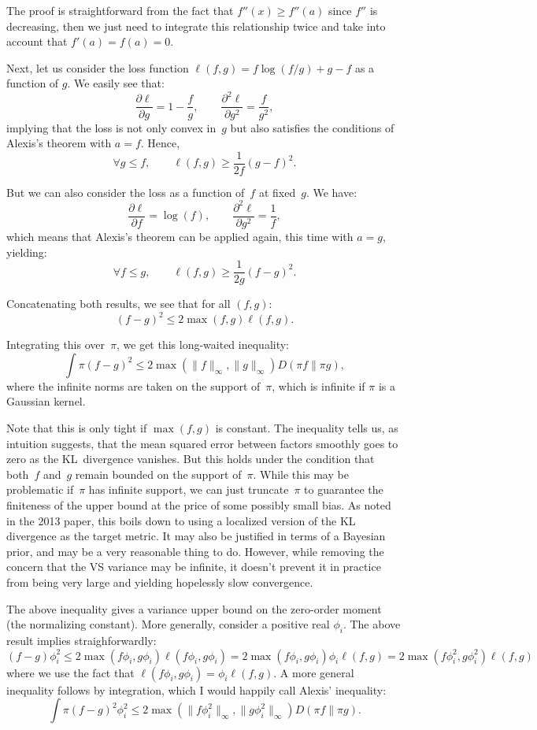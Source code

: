 \documentclass{article}
\begin{document}
The proof is straightforward from the fact that $f''(x) \geq f''(a)$ since $f''$ is decreasing, then we just need to integrate this relationship twice and take into account that $f'(a)=f(a)=0$.

Next, let us consider the loss function $\ell(f,g)=f\log(f/g)+g-f$ as a function of $g$. We easily see that:
$$
\frac{\partial\ell}{\partial g} = 1 - \frac{f}{g},
\qquad
\frac{\partial^2\ell}{\partial g^2} = \frac{f}{g^2},
$$
implying that the loss is not only convex in~$g$ but also satisfies the conditions of Alexis's theorem with $a=f$. Hence,
$$
\forall g\leq f,
\qquad
\ell(f, g) \geq \frac{1}{2f} (g - f)^2. 
$$

But we can also consider the loss as a function of~$f$ at fixed~$g$. We have:
$$
\frac{\partial\ell}{\partial f} = \log(f),
\qquad
\frac{\partial^2\ell}{\partial g^2} = \frac{1}{f},
$$
which means that Alexis's theorem can be applied again, this time with $a=g$, yielding:
$$
\forall f\leq g,
\qquad
\ell(f, g) \geq \frac{1}{2g} (f - g)^2. 
$$

Concatenating both results, we see that for all $(f, g)$:
$$
(f-g)^2 \leq 2 \max(f, g)\ell(f, g).
$$

Integrating this over~$\pi$, we get this long-waited inequality:
\begin{equation}
\label{eq:variance_inequality}
\int \pi (f-g)^2 \leq 2\max(\|f\|_\infty, \|g\|_\infty) D(\pi f\|\pi g),
\end{equation}
where the infinite norms are taken on the support of~$\pi$, which is infinite if $\pi$ is a Gaussian kernel.

Note that this is only tight if $\max(f,g)$ is constant. The inequality tells us, as intuition suggests, that the mean squared error between factors smoothly goes to zero as the KL~divergence vanishes. But this holds under the condition that both~$f$ and~$g$ remain bounded on the support of~$\pi$. While this may be problematic if~$\pi$ has infinite support, we can just truncate~$\pi$ to guarantee the finiteness of the upper bound at the price of some possibly small bias. As noted in the 2013 paper, this boils down to using a localized version of the KL divergence as the target metric. It may also be justified in terms of a Bayesian prior, and may be a very reasonable thing to do. However, while removing the concern that the VS variance may be infinite, it doesn't prevent it in practice from being very large and yielding
hopelessly slow convergence.

The above inequality gives a variance upper bound on the zero-order moment (the normalizing constant). More generally, consider a positive real $\phi_i$. The above result implies straighforwardly:
$$
(f-g)\phi_i^2
\leq 2 \max(f\phi_i, g\phi_i) \ell(f\phi_i, g\phi_i)
= 2 \max(f\phi_i, g\phi_i) \phi_i\ell(f, g)
= 2 \max(f\phi_i^2, g\phi_i^2) \ell(f, g)
$$
where we use the fact that $\ell(f\phi_i,g\phi_i)=\phi_i\ell(f,g)$. A more general inequality follows by integration, which I would happily call Alexis' inequality:
$$
\int \pi (f-g)^2\phi_i^2 \leq 2\max(\|f\phi_i^2\|_\infty, \|g\phi_i^2\|_\infty) D(\pi f\|\pi g).
$$
\end{document}
